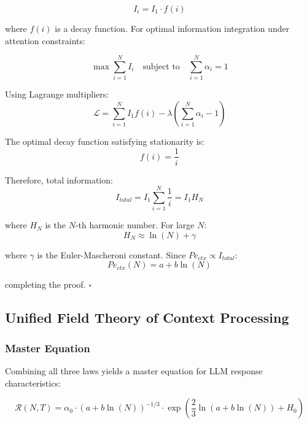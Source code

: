 \documentclass[conference]{IEEEtran}
\begin{document}
\begin{equation}
I_i = I_1 \cdot f(i)
\end{equation}

where $f(i)$ is a decay function. For optimal information integration under attention constraints:

\begin{equation}
\max \sum_{i=1}^N I_i \quad \text{subject to} \quad \sum_{i=1}^N \alpha_i = 1
\end{equation}

Using Lagrange multipliers:
\begin{equation}
\mathcal{L} = \sum_{i=1}^N I_1 f(i) - \lambda\left(\sum_{i=1}^N \alpha_i - 1\right)
\end{equation}

The optimal decay function satisfying stationarity is:
\begin{equation}
f(i) = \frac{1}{i}
\end{equation}

Therefore, total information:
\begin{equation}
I_{total} = I_1 \sum_{i=1}^N \frac{1}{i} = I_1 H_N
\end{equation}

where $H_N$ is the $N$-th harmonic number. For large $N$:
\begin{equation}
H_N \approx \ln(N) + \gamma
\end{equation}

where $\gamma$ is the Euler-Mascheroni constant. Since $Pe_{ctx} \propto I_{total}$:
\begin{equation}
Pe_{ctx}(N) = a + b\ln(N)
\end{equation}

completing the proof. $\square$

\subsection{Unified Field Theory of Context Processing}

\subsubsection{Master Equation}

Combining all three laws yields a master equation for LLM response characteristics:

\begin{equation}
\boxed{\mathcal{R}(N, T) = \alpha_0 \cdot (a + b\ln(N))^{-1/3} \cdot \exp\left(\frac{2}{3}\ln(a + b\ln(N)) + H_0\right)}
\end{equation}
\end{document}
